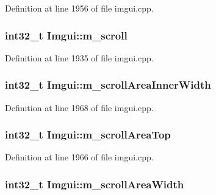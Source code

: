 Definition at line 1956 of file imgui.\+cpp.

\hypertarget{struct_imgui_ace74bbf1a80fc8155680b2c7cc215866}{
\subsubsection[{m\+\_\+scroll}]{\setlength{\rightskip}{0pt plus 5cm}int32\+\_\+t Imgui\+::m\+\_\+scroll}}\label{struct_imgui_ace74bbf1a80fc8155680b2c7cc215866}


Definition at line 1935 of file imgui.\+cpp.

\hypertarget{struct_imgui_a82f08746442ad6d35d5a9916dad376e9}{
\subsubsection[{m\+\_\+scroll\+Area\+Inner\+Width}]{\setlength{\rightskip}{0pt plus 5cm}int32\+\_\+t Imgui\+::m\+\_\+scroll\+Area\+Inner\+Width}}\label{struct_imgui_a82f08746442ad6d35d5a9916dad376e9}


Definition at line 1968 of file imgui.\+cpp.

\hypertarget{struct_imgui_aaa84d2ed9b429ebc8465793af4a69423}{
\subsubsection[{m\+\_\+scroll\+Area\+Top}]{\setlength{\rightskip}{0pt plus 5cm}int32\+\_\+t Imgui\+::m\+\_\+scroll\+Area\+Top}}\label{struct_imgui_aaa84d2ed9b429ebc8465793af4a69423}


Definition at line 1966 of file imgui.\+cpp.

\hypertarget{struct_imgui_abb0e9f220b5bd0d58c9042531deb009d}{
\subsubsection[{m\+\_\+scroll\+Area\+Width}]{\setlength{\rightskip}{0pt plus 5cm}int32\+\_\+t Imgui\+::m\+\_\+scroll\+Area\+Width}}\label{struct_imgui_abb0e9f220b5bd0d58c9042531deb009d}



